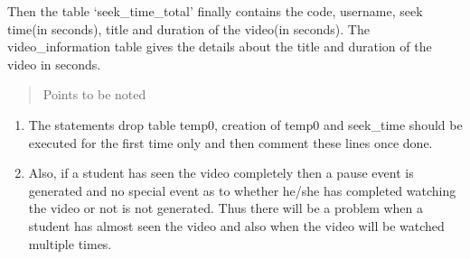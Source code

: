 \documentclass[a4paper,12pt,oneside]{sphinxmanual}
\begin{document}
Then the table `seek\_time\_total' finally contains the code, username, seek time(in seconds), title and duration of the video(in seconds). The video\_information table gives the details about the title and duration of the video in seconds.
\begin{quote}\begin{description}
\item[{Points to be noted}] \leavevmode
\end{description}\end{quote}
\begin{enumerate}
\item {} 
The statements drop table temp0, creation of temp0 and seek\_time should be executed for the first time only and then comment these lines once done.

\item {} 
Also, if a student has seen the video completely then a pause event is generated and no special event as to whether he/she has completed watching the video or not is not generated. Thus there will be a problem when a student has almost seen the video and also when the video will be watched multiple times.

\end{enumerate}
\end{document}

